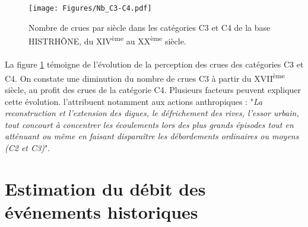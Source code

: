 \documentclass[11pt]{article}
\begin{document}
	\begin{figure}[h]
	\centering
		\texttt{[image: Figures/Nb\_C3-C4.pdf]}
        \caption{Nombre de crues par siècle dans les catégories C3 et C4 de la base HISTRHÔNE, du XIV\textsuperscript{ème} au XX\textsuperscript{ème} siècle.}
		\label{fig:Nb_C3C4}
	\end{figure}	
	
	\paragraph{} La figure \ref{fig:Nb_C3C4} témoigne de l'évolution de la perception des crues des catégories C3 et C4. On constate une diminution du nombre de crues C3 à partir du XVII\textsuperscript{ème} siècle, au profit des crues de la catégorie C4. Plusieurs facteurs peuvent expliquer cette évolution. \citet{pichard_sept_2014} l'attribuent notamment aux actions anthropiques : "\textit{La reconstruction et l'extension des digues, le défrichement des rives, l'essor urbain, tout concourt à concentrer les écoulements lors des plus grands épisodes tout en atténuant ou même en faisant disparaître les débordements ordinaires ou moyens (C2 et C3)}".
	

\section{Estimation du débit des événements historiques}
\end{document}
